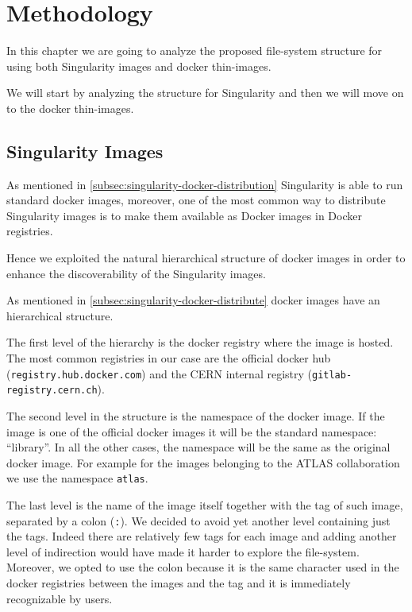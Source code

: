 \chapter{Methodology}\label{ch:Methodology}

In this chapter we are going to analyze the proposed file-system structure for using both Singularity images and docker thin-images. 

We will start by analyzing the structure for Singularity and then we will move on to the docker thin-images.

\section{Singularity Images}

As mentioned in \ref{subsec:singularity-docker-distribution} Singularity is able to run standard docker images, moreover, one of the most common way to distribute Singularity images is to make them available as Docker images in Docker registries.

Hence we exploited the natural hierarchical structure of docker images in order to enhance the discoverability of the Singularity images.

As mentioned in \ref{subsec:singularity-docker-distribute} docker images have an hierarchical structure.

The first level of the hierarchy is the docker registry where the image is hosted. The most common registries in our case are the official docker hub (\texttt{registry.hub.docker.com}) and the CERN internal registry (\texttt{gitlab-registry.cern.ch}).

The second level in the structure is the namespace of the docker image. 
If the image is one of the official docker images it will be the standard namespace: “library”.
In all the other cases, the namespace will be the same as the original docker image.
For example for the images belonging to the ATLAS collaboration we use the namespace \texttt{atlas}.

The last level is the name of the image itself together with the tag of such image, separated by a colon (\texttt{:}).
We decided to avoid yet another level containing just the tags.
Indeed there are relatively few tags for each image and adding another level of indirection would have made it harder to explore the file-system.
Moreover, we opted to use the colon because it is the same character used in the docker registries between the images and the tag and it is immediately recognizable by users.

